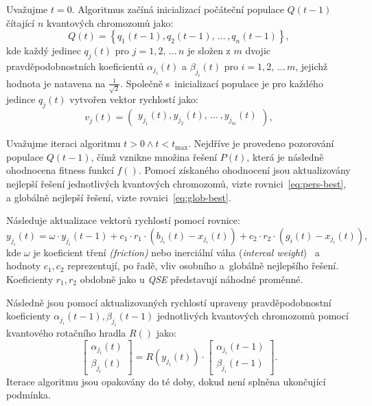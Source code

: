 Uvažujme $t=0$. Algoritmus začíná inicializací počáteční populace $Q\left(t-1\right)$ čítající $n$ kvantových chromozomů jako: 
\begin{equation*}
    Q\left(t\right) = \left\{q_1\left(t-1\right), q_2\left(t-1\right),\,\dots\,,q_n\left(t-1\right)\right\},
\end{equation*}
kde každý jedinec $q_j\left(t\right)$ pro $j=1,2,\,\dots\,n$ je složen z $m$ dvojic pravděpodobnostních koeficientů $\alpha_{j_i}\left(t\right)$ a $\beta_{j_i}\left(t\right)$ pro $i=1,2,\,\dots\,m$, jejichž hodnota je natavena na $\frac{1}{\sqrt{2}}$.
Společně s~inicializací populace je pro každého jedince $q_j\left(t\right)$ vytvořen vektor rychlostí jako:
\begin{equation*}
    v_j\left(t\right) = \begin{pmatrix} y_{j_1}\left(t\right), y_{j_2}\left(t\right),\,\dots\,, y_{j_m}\left(t\right) \end{pmatrix},
\end{equation*}

Uvažujme iteraci algoritmu $t>0 \wedge t<t_{\text{max}}$. 
Nejdříve je provedeno pozorování populace $Q\left(t-1\right)$, čímž vznikne množina řešení $P\left(t\right)$, která je následně ohodnocena fitness funkcí $f\left(\right)$. 
Pomocí získaného ohodnocení jsou aktualizovány nejlepší řešení jednotlivých kvantových chromozomů, vizte rovnici~\ref{eq:pers-best}, a globálně nejlepší řešení, vizte rovnici~\ref{eq:glob-best}. 

Následuje aktualizace vektorů rychlostí pomocí rovnice:
\begin{equation*}
    y_{j_i}\left(t\right) = \omega \cdot y_{j_i}\left(t-1\right) + c_1 \cdot r_1 \cdot (b_{j_i}\left(t\right) - x_{j_i}\left(t\right)) + c_2 \cdot r_2 \cdot (g_i\left(t\right) - x_{j_i}\left(t\right)),
\end{equation*}
kde $\omega$ je koeficient tření \emph{(friction)} nebo inerciální váha (\emph{intercal weight})~\cite{PSO-c1c2w} a hodnoty $c_1,c_2$ reprezentují, po řadě, vliv osobního a~globálně nejlepšího řešení. 
Koeficienty $r_1, r_2$ obdobně jako u \emph{QSE} představují náhodné proměnné. 

Následně jsou pomocí aktualizovaných rychlostí upraveny pravděpodobnostní koeficienty $\alpha_{j_i}\left(t-1\right), \beta_{j_i}\left(t-1\right)$ jednotlivých kvantových chromozomů pomocí kvantového rotačního hradla $R\left(\right)$ jako: 
\begin{equation*}
    \begin{bmatrix}
        \alpha_{j_i}\left(t\right) \\
        \beta_{j_i}\left(t\right)
    \end{bmatrix}
    =
    R\left(y_{j_i}\left(t\right)\right) \cdot
    \begin{bmatrix}
        \alpha_{j_i}\left(t-1\right) \\
        \beta_{j_i}\left(t-1\right) 
    \end{bmatrix}.
\end{equation*}
Iterace algoritmu jsou opakovány do té doby, dokud není splněna ukončující podmínka. 

